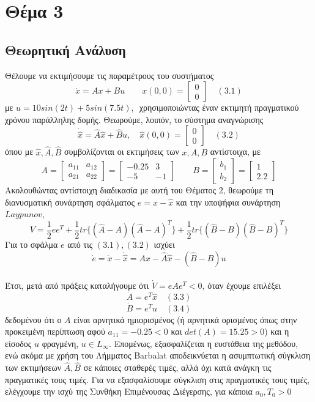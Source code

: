 \documentclass[12pt]{article}
\begin{document}
\section{Θέμα 3}
\subsection{Θεωρητική Ανάλυση}
Θέλουμε να εκτιμήσουμε τις παραμέτρους του συστήματος
\[\dot{x}= Ax+Bu \qquad x(0,0)=\begin{bmatrix}   
			0\\
			0
\end{bmatrix} \quad(3.1)\]
με $u=10sin(2t)+5sin(7.5t)$, $ $ χρησιμοποιώντας έναν εκτιμητή πραγματικού χρόνου παράλληλης δομής. Θεωρούμε, λοιπόν, το σύστημα αναγνώρισης
\[ \dot{\hat{x}}=\hat{A}\hat{x}+\hat{B}u , \quad \hat{x}(0,0)=\begin{bmatrix}   
			0\\
			0
\end{bmatrix} \quad (3.2) \]
όπου με $\hat{x},\hat{A},\hat{B}$ συμβολίζονται οι εκτιμήσεις των $x,A,B$ αντίστοιχα, με \\
\[ Α= \begin{bmatrix}   
			a_{11} & a_{12} \\
			a_{21} & a_{22}
\end{bmatrix}= \begin{bmatrix}   
			-0.25 & 3 \\
			-5 & -1
\end{bmatrix} 
\qquad
B=\begin{bmatrix}   
			b_{1}\\
			b_{2}
\end{bmatrix}=
\begin{bmatrix}   
			1\\
			2.2
\end{bmatrix}
\]
Ακολουθώντας αντίστοιχη διαδικασία με αυτή του Θέματος 2, θεωρούμε τη διανυσματική συνάρτηση σφάλματος $e=x-\hat{x}$ και την υποψήφια συνάρτηση $Laypunov$,
\[V=\frac{1}{2}ee^{T}+\frac{1}{2}tr\{(\hat{A}-A)(\hat{A}-A)^{T}\}+\frac{1}{2}tr\{(\hat{B}-B)(\hat{B}-B)^{T}\} \]
Για το σφάλμα $e$ από τις $(3.1),(3.2)$ ισχύει
\[ \dot{e}=\dot{x}-\dot{\hat{x}}= Ax-\hat{A}\hat{x}-(\hat{B}-B)u\]
\\
Έτσι, μετά από πράξεις καταλήγουμε ότι $\dot{V}=eAe^{T}<0$, όταν έχουμε επιλέξει
\[ \dot{A}=e^{T}\hat{x} \quad (3.3) \] 
\[\dot{B}=e^{T}u \quad (3.4) \]
δεδομένου ότι ο $A$ είναι αρνητικά ημιορισμένος (ή αρνητικά ορισμένος όπως στην προκειμένη περίπτωση αφού $a_{11}=-0.25<0$ και $det(A)=15.25>0$) και η είσοδος $u$ φραγμένη, $u\in L_{\infty}$. Επομένως, εξασφαλίζεται η ευστάθεια της μεθόδου, ενώ ακόμα με χρήση του Λήμματος Barbalat αποδεικνύεται η ασυμπτωτική σύγκλιση των εκτιμήσεων $\hat{A},\hat{B}$  σε κάποιες σταθερές τιμές, αλλά όχι κατά ανάγκη τις πραγματικές τους τιμές. Για να εξασφαλίσουμε σύγκλιση στις πραγματικές τους τιμές, ελέγχουμε την ισχύ της Συνθήκη Επιμένουσας Διέγερσης, για κάποια $a_0,T_0 > 0 $
\end{document}
